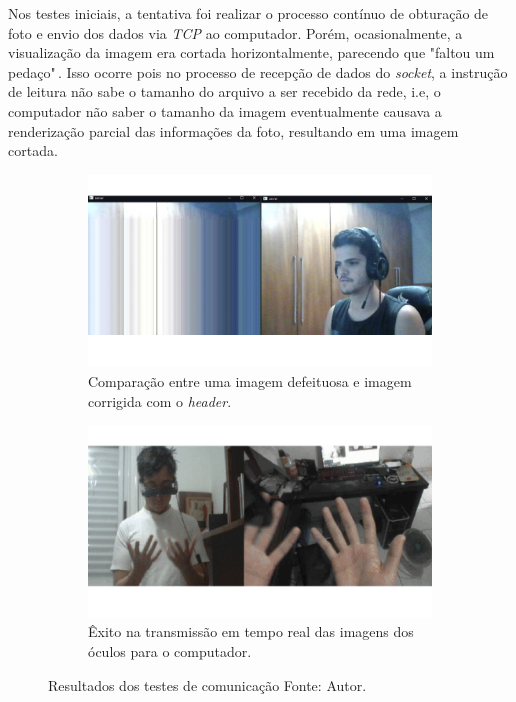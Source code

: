 
Nos testes iniciais, a tentativa foi realizar o processo contínuo de obturação de foto e envio dos dados via \textit{TCP} ao computador. Porém, ocasionalmente, a visualização da imagem era cortada horizontalmente, parecendo que "faltou um pedaço"\(\,\). Isso ocorre pois no processo de recepção de dados do \textit{socket}, a instrução de leitura não sabe o tamanho do arquivo a ser recebido da rede, i.e, o computador não saber o tamanho da imagem eventualmente causava a renderização parcial das informações da foto, resultando em uma imagem cortada.

\begin{figure}[ht]
    \centering
        \begin{subfigure}{.45\textwidth}
            \centering
            \includegraphics[width=.95\linewidth]{figuras/header.png}
    \caption{Comparação entre uma imagem defeituosa e imagem corrigida com o \textit{header}.}
    \label{fig:header}
        \end{subfigure}
        \begin{subfigure}{.45\textwidth}
            \centering
            \includegraphics[width=.95\linewidth]{figuras/comm.png}
            \caption{Êxito na transmissão em tempo real das imagens dos óculos para o computador.}
            \label{fig:communication}
        \end{subfigure}
        \caption{Resultados dos testes de comunicação Fonte: Autor.}
        \label{fig:comm-tests}
    \end{figure}

